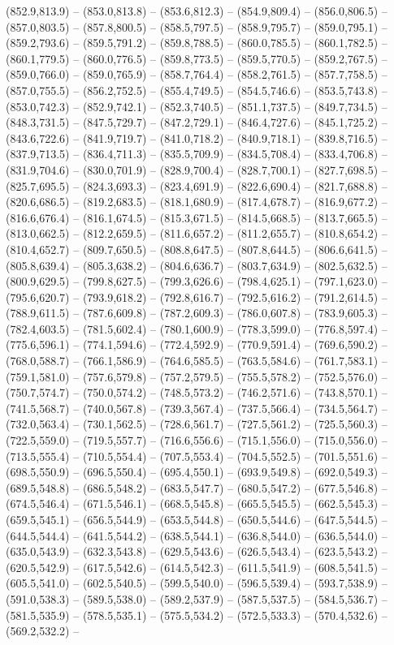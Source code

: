 (852.9,813.9) -- (853.0,813.8) -- (853.6,812.3) -- (854.9,809.4) -- (856.0,806.5) -- (857.0,803.5) -- (857.8,800.5) -- (858.5,797.5) -- (858.9,795.7) -- (859.0,795.1) -- (859.2,793.6) -- (859.5,791.2) -- (859.8,788.5) -- (860.0,785.5) -- (860.1,782.5) -- (860.1,779.5) -- (860.0,776.5) -- (859.8,773.5) -- (859.5,770.5) -- (859.2,767.5) -- (859.0,766.0) -- (859.0,765.9) -- (858.7,764.4) -- (858.2,761.5) -- (857.7,758.5) -- (857.0,755.5) -- (856.2,752.5) -- (855.4,749.5) -- (854.5,746.6) -- (853.5,743.8) -- (853.0,742.3) -- (852.9,742.1) -- (852.3,740.5) -- (851.1,737.5) -- (849.7,734.5) -- (848.3,731.5) -- (847.5,729.7) -- (847.2,729.1) -- (846.4,727.6) -- (845.1,725.2) -- (843.6,722.6) -- (841.9,719.7) -- (841.0,718.2) -- (840.9,718.1) -- (839.8,716.5) -- (837.9,713.5) -- (836.4,711.3) -- (835.5,709.9) -- (834.5,708.4) -- (833.4,706.8) -- (831.9,704.6) -- (830.0,701.9) -- (828.9,700.4) -- (828.7,700.1) -- (827.7,698.5) -- (825.7,695.5) -- (824.3,693.3) -- (823.4,691.9) -- (822.6,690.4) -- (821.7,688.8) -- (820.6,686.5) -- (819.2,683.5) -- (818.1,680.9) -- (817.4,678.7) -- (816.9,677.2) -- (816.6,676.4) -- (816.1,674.5) -- (815.3,671.5) -- (814.5,668.5) -- (813.7,665.5) -- (813.0,662.5) -- (812.2,659.5) -- (811.6,657.2) -- (811.2,655.7) -- (810.8,654.2) -- (810.4,652.7) -- (809.7,650.5) -- (808.8,647.5) -- (807.8,644.5) -- (806.6,641.5) -- (805.8,639.4) -- (805.3,638.2) -- (804.6,636.7) -- (803.7,634.9) -- (802.5,632.5) -- (800.9,629.5) -- (799.8,627.5) -- (799.3,626.6) -- (798.4,625.1) -- (797.1,623.0) -- (795.6,620.7) -- (793.9,618.2) -- (792.8,616.7) -- (792.5,616.2) -- (791.2,614.5) -- (788.9,611.5) -- (787.6,609.8) -- (787.2,609.3) -- (786.0,607.8) -- (783.9,605.3) -- (782.4,603.5) -- (781.5,602.4) -- (780.1,600.9) -- (778.3,599.0) -- (776.8,597.4) -- (775.6,596.1) -- (774.1,594.6) -- (772.4,592.9) -- (770.9,591.4) -- (769.6,590.2) -- (768.0,588.7) -- (766.1,586.9) -- (764.6,585.5) -- (763.5,584.6) -- (761.7,583.1) -- (759.1,581.0) -- (757.6,579.8) -- (757.2,579.5) -- (755.5,578.2) -- (752.5,576.0) -- (750.7,574.7) -- (750.0,574.2) -- (748.5,573.2) -- (746.2,571.6) -- (743.8,570.1) -- (741.5,568.7) -- (740.0,567.8) -- (739.3,567.4) -- (737.5,566.4) -- (734.5,564.7) -- (732.0,563.4) -- (730.1,562.5) -- (728.6,561.7) -- (727.5,561.2) -- (725.5,560.3) -- (722.5,559.0) -- (719.5,557.7) -- (716.6,556.6) -- (715.1,556.0) -- (715.0,556.0) -- (713.5,555.4) -- (710.5,554.4) -- (707.5,553.4) -- (704.5,552.5) -- (701.5,551.6) -- (698.5,550.9) -- (696.5,550.4) -- (695.4,550.1) -- (693.9,549.8) -- (692.0,549.3) -- (689.5,548.8) -- (686.5,548.2) -- (683.5,547.7) -- (680.5,547.2) -- (677.5,546.8) -- (674.5,546.4) -- (671.5,546.1) -- (668.5,545.8) -- (665.5,545.5) -- (662.5,545.3) -- (659.5,545.1) -- (656.5,544.9) -- (653.5,544.8) -- (650.5,544.6) -- (647.5,544.5) -- (644.5,544.4) -- (641.5,544.2) -- (638.5,544.1) -- (636.8,544.0) -- (636.5,544.0) -- (635.0,543.9) -- (632.3,543.8) -- (629.5,543.6) -- (626.5,543.4) -- (623.5,543.2) -- (620.5,542.9) -- (617.5,542.6) -- (614.5,542.3) -- (611.5,541.9) -- (608.5,541.5) -- (605.5,541.0) -- (602.5,540.5) -- (599.5,540.0) -- (596.5,539.4) -- (593.7,538.9) -- (591.0,538.3) -- (589.5,538.0) -- (589.2,537.9) -- (587.5,537.5) -- (584.5,536.7) -- (581.5,535.9) -- (578.5,535.1) -- (575.5,534.2) -- (572.5,533.3) -- (570.4,532.6) -- (569.2,532.2) -- 
